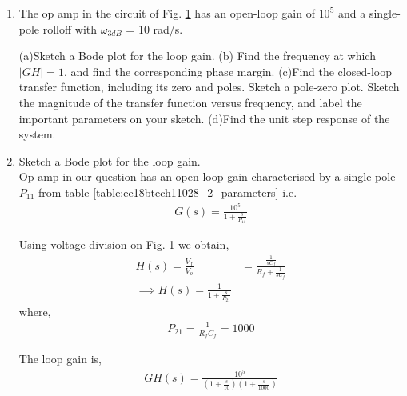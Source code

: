 \begin{enumerate}[label=\arabic*.,ref=\theenumi]
\item The op amp in the circuit of Fig. \ref{fig:ee18btech11028_2_q} has an open-loop gain of $10^{5}$ and a single-pole rolloff with $\omega_{3dB}$ = 10 rad/s.

\renewcommand{\thefigure}{\theenumi.\arabic{figure}}
%
\begin{figure}[!ht]
	\begin{center}
		\resizebox{\columnwidth}{!}{}
	\end{center}
\caption{}
\label{fig:ee18btech11028_2_q}
\end{figure}
%
\begin{table}[!ht]
    \centering
    
    \caption{}
    \label{table:ee18btech11028_2_parameters}
\end{table}
(a)Sketch a Bode plot for the loop gain.
(b) Find the frequency at which $ |GH|= 1$, and find the corresponding phase margin.
(c)Find the closed-loop transfer function, including its zero
and poles. Sketch a pole-zero plot. Sketch the magnitude of
the transfer function versus frequency, and label the important parameters on your sketch.
(d)Find the unit step response of the system.
\item Sketch a Bode plot for the loop gain.
\\
\solution
Op-amp in our question has an open loop gain characterised by a single pole $P_{11} $ from table \ref{table:ee18btech11028_2_parameters} i.e.
\begin{align}
    G(s) = \frac{10^5}{1 + \frac{s}{P_{11}}}
        \label{eq:ee18btech11028_2_2}
\end{align}

Using voltage division on Fig. \ref{fig:ee18btech11028_2_q} we obtain,
\begin{align}
    H(s) = \frac{V_{f}}{V_{o}}
     &= \frac{\frac{1}{sC_{f}}}{R_{f} + \frac{1}{sC_{f}}}
    \\
    \implies H(s) = \frac{1}{1 + \frac{s}{P_{21}}}
        \label{eq:ee18btech11028_2_1}
\end{align}
where, 
\begin{align}
    P_{21} = \frac{1}{R_{f}C_{f}} = 1000
\end{align}

The loop gain is, 
\begin{align}
    GH(s) = \frac{10^5}{(1+\frac{s}{10})(1 + \frac{s}{1000})}
\end{align}


\end{enumerate}
